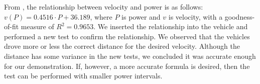 From , the relationship between velocity and power is as follows: $v(P) = 0.4516\cdot P + 36.189$, where $P$ is power and $v$ is velocity, with a goodness-of-fit measure of $R^2=0.9653$. We inserted the relationship into the vehicle and performed a new test to confirm the relationship. We observed that the vehicles drove more or less the correct distance for the desired velocity. Although the distance has some variance in the new tests, we concluded it was accurate enough for our demonstration. If, however, a more accurate formula is desired, then the test can be performed with smaller power intervals.

